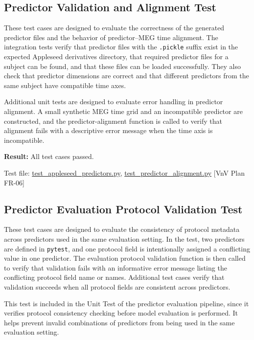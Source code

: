 \documentclass[12pt, titlepage]{article}
\begin{document}
\subsection{Predictor Validation and Alignment Test}

These test cases are designed to evaluate the correctness of the generated predictor files and the behavior of predictor--MEG time alignment.
The integration tests verify that predictor files with the \texttt{.pickle} suffix exist in the expected Appleseed derivatives directory, that required predictor files for a subject can be found, and that these files can be loaded successfully.
They also check that predictor dimensions are correct and that different predictors from the same subject have compatible time axes.

Additional unit tests are designed to evaluate error handling in predictor alignment.
A small synthetic MEG time grid and an incompatible predictor are constructed, and the predictor-alignment function is called to verify that alignment fails with a descriptive error message when the time axis is incompatible.

\textbf{Result:} All test cases passed.

Test file: \href{https://github.com/Krozix-2026/cas741-speech-trf/blob/main/src/test/test_appleseed_predictors.py}{test\_appleseed\_predictors.py}, \href{https://github.com/Krozix-2026/cas741-speech-trf/blob/main/src/test/test_predictor_alignment.py}{test\_predictor\_alignment.py} [VnV Plan FR-06]





\subsection{Predictor Evaluation Protocol Validation Test}

These test cases are designed to evaluate the consistency of protocol metadata across predictors used in the same evaluation setting.
In the test, two predictors are defined in \texttt{pytest}, and one protocol field is intentionally assigned a conflicting value in one predictor.
The evaluation protocol validation function is then called to verify that validation fails with an informative error message listing the conflicting protocol field name or names.
Additional test cases verify that validation succeeds when all protocol fields are consistent across predictors.

This test is included in the Unit Test of the predictor evaluation pipeline, since it verifies protocol consistency checking before model evaluation is performed.
It helps prevent invalid combinations of predictors from being used in the same evaluation setting.
\end{document}
